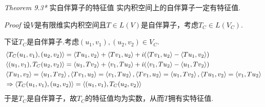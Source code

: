 \hspace*{\fill}

\textit{Theorem 9.3*} {\kaishu 实自伴算子的特征值}
实内积空间上的自伴算子一定有特征值.

\textit{Proof}
设\(V\)是有限维实内积空间且\(T \in L(V)\)是自伴算子，考虑\(T_C \in L(V_C)\).

下证\(T_C\)是自伴算子.考虑\((u_1,v_1),(u_2,v_2) \in V_C\).
    \begin{align*}
        &\ip{T_C(u_1,v_1)}{(u_2,v_2)}=\ip{Tu_1}{v_2}+\ip{Tv_1}{u_2}+i(\ip{Tv_1}{u_2}-\ip{Tu_1}{v_2}) \\
        &\ip{(u_1,v_1)}{T_C(u_2,v_2)}=\ip{u_1}{Tv_2}+\ip{v_1}{Tu_2}+i(\ip{v_1}{Tu_2}-\ip{u_1}{Tv_2}) \\
        &\ip{Tu_1}{v_2}=\ip{u_1}{Tv_2},\ip{Tv_1}{u_2}=\ip{v_1}{Tu_2},
         \ip{Tv_1}{u_2}=\ip{u_1}{Tv_2},\ip{Tu_1}{v_2}=\ip{v_1}{Tu_2} \\
        &\Rightarrow \ip{T_C(u_1,v_1)}{(u_2,v_2)}=\ip{(u_1,v_1)}{T_C(u_2,v_2)}
    \end{align*}
于是\(T_C\)是自伴算子，故\(T_C\)的特征值均为实数，从而\(T\)拥有实特征值.


